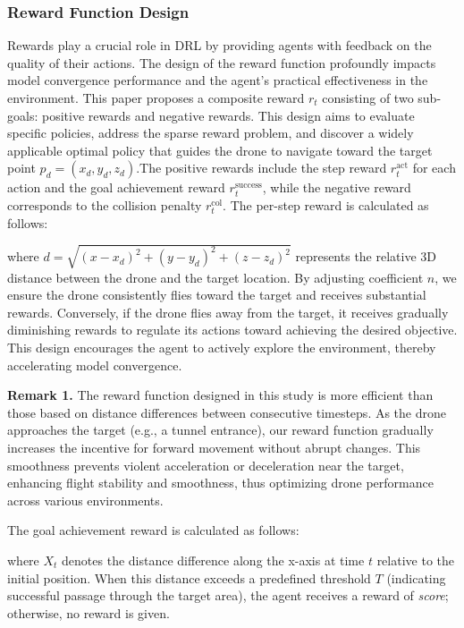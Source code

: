 \documentclass{aas}
\begin{document}
\subsubsection{Reward Function Design}

Rewards play a crucial role in DRL by providing agents with feedback on the quality of their actions. The design of the reward function profoundly impacts model convergence performance and the agent's practical effectiveness in the environment. This paper proposes a composite reward \( r_t \) consisting of two sub-goals: positive rewards and negative rewards. This design aims to evaluate specific policies, address the sparse reward problem, and discover a widely applicable optimal policy that guides the drone to navigate toward the target point \( p_d = (x_d, y_d, z_d) \).The positive rewards include the step reward \( r_{t}^{\text{act}} \) for each action and the goal achievement reward \( r_{t}^{\text{success}} \), while the negative reward corresponds to the collision penalty \( r_{t}^{\text{col}} \). The per-step reward is calculated as follows:


where \( d = \sqrt{(x - x_d)^2 + (y - y_d)^2 + (z - z_d)^2} \) represents the relative 3D distance between the drone and the target location. By adjusting coefficient \( n \), we ensure the drone consistently flies toward the target and receives substantial rewards. Conversely, if the drone flies away from the target, it receives gradually diminishing rewards to regulate its actions toward achieving the desired objective. This design encourages the agent to actively explore the environment, thereby accelerating model convergence.

\textbf{Remark 1.} The reward function designed in this study is more efficient than those based on distance differences between consecutive timesteps. As the drone approaches the target (e.g., a tunnel entrance), our reward function gradually increases the incentive for forward movement without abrupt changes. This smoothness prevents violent acceleration or deceleration near the target, enhancing flight stability and smoothness, thus optimizing drone performance across various environments.

The goal achievement reward is calculated as follows:


where \( X_t \) denotes the distance difference along the x-axis at time \( t \) relative to the initial position. When this distance exceeds a predefined threshold \( T \) (indicating successful passage through the target area), the agent receives a reward of \textit{score}; otherwise, no reward is given.
\end{document}
